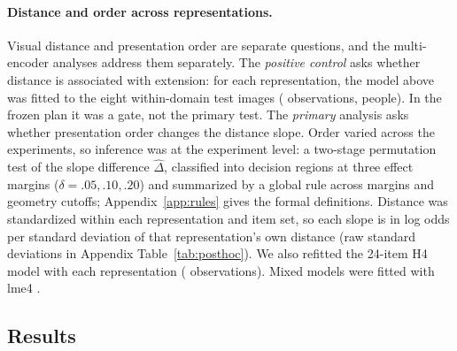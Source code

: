\documentclass[11pt]{article}
\begin{document}
\paragraph{Distance and order across representations.} Visual distance and presentation order are separate questions, and the multi-encoder analyses address them separately. The \emph{positive control} asks whether distance is associated with extension: for each representation, the model above was fitted to the eight within-domain test images (\VtPcNobs{} observations, \VtPersons{} people). In the frozen plan it was a gate, not the primary test. The \emph{primary} analysis asks whether presentation order changes the distance slope. Order varied across the \VtNexp{} experiments, so inference was at the experiment level: a two-stage permutation test of the slope difference $\hat\Delta$, classified into decision regions at three effect margins ($\delta = .05, .10, .20$) and summarized by a global rule across margins and geometry cutoffs; Appendix~\ref{app:rules} gives the formal definitions. Distance was standardized within each representation and item set, so each slope is in log odds per standard deviation of that representation's own distance (raw standard deviations in Appendix Table~\ref{tab:posthoc}). We also refitted the 24-item H4 model with each representation (\VtHfourNobs{} observations). Mixed models were fitted with lme4 \parencite{bates2015}.

\subsection{Results}
\label{sec:results}
\end{document}
